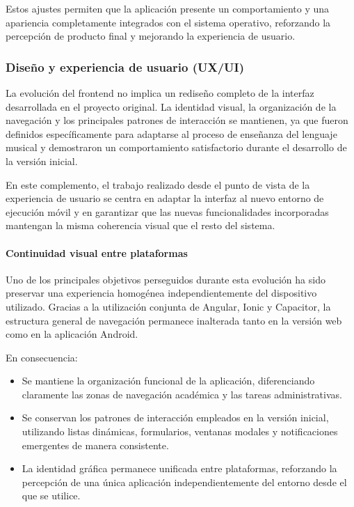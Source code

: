 Estos ajustes permiten que la aplicación presente un comportamiento y una apariencia completamente integrados con el sistema operativo, reforzando la percepción de producto final y mejorando la experiencia de usuario.

\subsubsection{Diseño y experiencia de usuario (UX/UI)}
\label{sec:frontend_diseno_ext}

La evolución del frontend no implica un rediseño completo de la interfaz desarrollada en el proyecto original. La identidad visual, la organización de la navegación y los principales patrones de interacción se mantienen, ya que fueron definidos específicamente para adaptarse al proceso de enseñanza del lenguaje musical y demostraron un comportamiento satisfactorio durante el desarrollo de la versión inicial.

En este complemento, el trabajo realizado desde el punto de vista de la experiencia de usuario se centra en adaptar la interfaz al nuevo entorno de ejecución móvil y en garantizar que las nuevas funcionalidades incorporadas mantengan la misma coherencia visual que el resto del sistema.

\paragraph{Continuidad visual entre plataformas}

Uno de los principales objetivos perseguidos durante esta evolución ha sido preservar una experiencia homogénea independientemente del dispositivo utilizado. Gracias a la utilización conjunta de Angular, Ionic y Capacitor, la estructura general de navegación permanece inalterada tanto en la versión web como en la aplicación Android.

En consecuencia:

\begin{itemize}
    \item Se mantiene la organización funcional de la aplicación, diferenciando claramente las zonas de navegación académica y las tareas administrativas.
    \item Se conservan los patrones de interacción empleados en la versión inicial, utilizando listas dinámicas, formularios, ventanas modales y notificaciones emergentes de manera consistente.
    \item La identidad gráfica permanece unificada entre plataformas, reforzando la percepción de una única aplicación independientemente del entorno desde el que se utilice.
\end{itemize}

